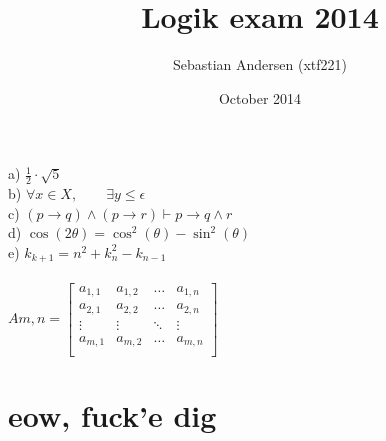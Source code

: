\message{ !name(lol.tex)}\documentclass{article}
\title{Logik exam 2014}
\author{Sebastian Andersen (xtf221)}
\date{October 2014}
\newcommand{\Fin}{
\vfill
\begin{center}
\textit{}\label{FIN}
\end{center}}
\begin{document}


a) $\frac{1}{2} \cdot \sqrt{5}$\\
b) $\forall{x} \in X, \hspace{2em} \exists{y \leq \epsilon}$\\
c) $(p \to q) \land (p \to r) \vdash p \to q \land r$\\
d) $\cos(2 \theta) = \cos^2(\theta) - \sin^2(\theta)$\\
e) $k_{k+1} = n^2 + k^2_n - k_{n-1}$\\\\
$Am,n =
\begin{bmatrix}
  a_{1,1} & a_{1,2} & \hdots & a_{1,n}\\
  a_{2,1} & a_{2,2} & \hdots & a_{2,n}\\
  \vdots & \vdots & \ddots & \vdots\\
  a_{m,1} & a_{m,2} & \hdots & a_{m,n}\\
\end{bmatrix}
$

\section*{eow, fuck'e dig}


\Fin
\end{document}
